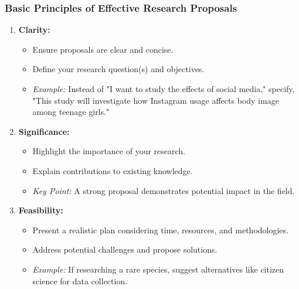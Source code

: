 \documentclass[aspectratio=169]{beamer}
\begin{document}
\begin{frame}[fragile]
    \frametitle{Basic Principles of Effective Research Proposals}
    \begin{enumerate}
        \item \textbf{Clarity:}
        \begin{itemize}
            \item Ensure proposals are clear and concise.
            \item Define your research question(s) and objectives.
            \item \textit{Example:} Instead of "I want to study the effects of social media," specify, "This study will investigate how Instagram usage affects body image among teenage girls."
        \end{itemize}
        
        \item \textbf{Significance:}
        \begin{itemize}
            \item Highlight the importance of your research.
            \item Explain contributions to existing knowledge. 
            \item \textit{Key Point:} A strong proposal demonstrates potential impact in the field.
        \end{itemize}

        \item \textbf{Feasibility:}
        \begin{itemize}
            \item Present a realistic plan considering time, resources, and methodologies.
            \item Address potential challenges and propose solutions.
            \item \textit{Example:} If researching a rare species, suggest alternatives like citizen science for data collection.
        \end{itemize}


\end{enumerate}
\end{frame}
\end{document}
